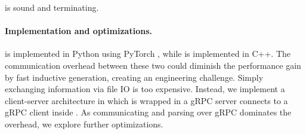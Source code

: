 
\begin{theorem}
\tool is sound and terminating.
\end{theorem}





\paragraph{Implementation and optimizations.}
\tool is implemented in Python using PyTorch \cite{pytorch}, while \spc is implemented in C++. 
The communication overhead between these two could diminish the performance gain by fast inductive generation, creating an engineering challenge.  
Simply exchanging information via file IO is too expensive.
Instead, we implement a client-server architecture in which \tool is wrapped in a gRPC server connects to a gRPC client inside \spc.
As communicating and parsing over gRPC dominates the overhead, we explore further optimizations. 

